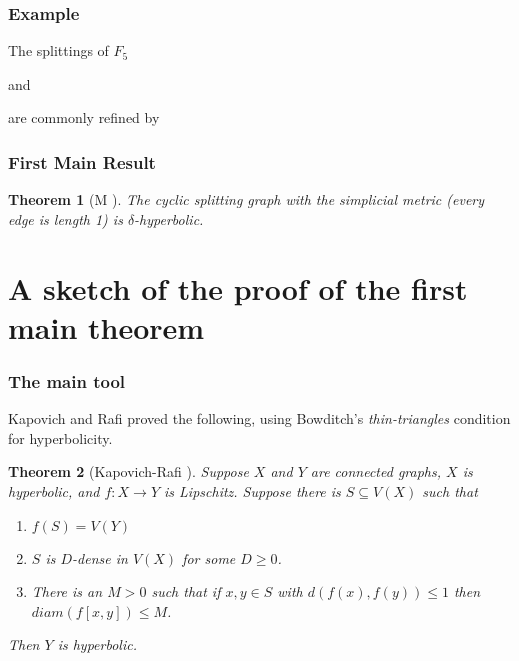 \documentclass{beamer}
\theoremstyle{theorem}
\newtheorem{thm}{Theorem}
\theoremstyle{definition}
\renewcommand{\-}{\ensuremath{^{-1}}}
\renewcommand{\>}{\ensuremath{\rightarrow}}
\renewcommand{\(}{\langle}
\renewcommand{\)}{\rangle}
\begin{document}
\begin{frame}
\frametitle{Example}
The splittings of $F_5$
\begin{center}
\end{center}
\pause
and
\begin{center}
\end{center}
\pause
are commonly refined by
\begin{center}
\end{center}
\end{frame}

\begin{frame}
\frametitle{First Main Result}
\begin{thm}[M \cite{Mann13}]
The cyclic splitting graph with the simplicial metric (every edge is length 1) is $\delta$-hyperbolic. 
\end{thm}
\end{frame}

\section{A sketch of the proof of the first main theorem}

\begin{frame}
\frametitle{The main tool}
Kapovich and Rafi proved the following, using Bowditch's \cite{Bowditch} \emph{thin-triangles} condition for hyperbolicity.
\pause
\begin{thm}[Kapovich-Rafi \cite{KapovichRafi}]
Suppose $X$ and $Y$ are connected graphs, $X$ is hyperbolic, and $f : X \> Y$ is Lipschitz. Suppose there is $S \subseteq V(X)$ such that
\begin{enumerate}
\item $f(S) = V(Y)$ 
\item $S$ is $D$-dense in $V(X)$ for some $D \geq 0$. 
\item There is an $M > 0$ such that if $x,y \in S$ with $d(f(x),f(y)) \leq 1$ then $diam(f[x,y]) \leq M$. 
\end{enumerate}
Then $Y$ is hyperbolic.
\end{thm}
\end{frame}
\end{document}
